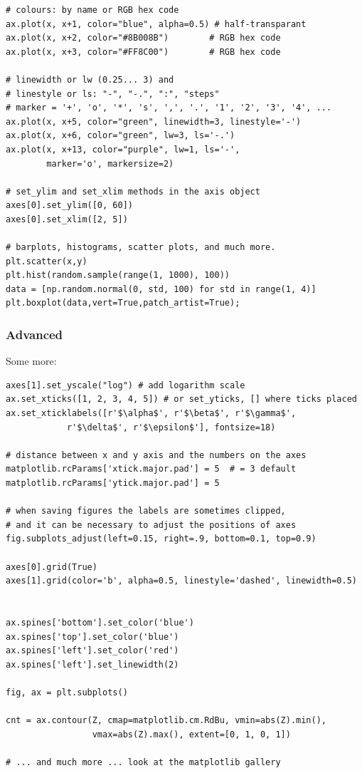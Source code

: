 \documentclass[11pt]{article}
\begin{document}
\begin{lstlisting}
# colours: by name or RGB hex code
ax.plot(x, x+1, color="blue", alpha=0.5) # half-transparant
ax.plot(x, x+2, color="#8B008B")        # RGB hex code
ax.plot(x, x+3, color="#FF8C00")        # RGB hex code 

# linewidth or lw (0.25... 3) and 
# linestyle or ls: "-", "-.", ":", "steps"
# marker = '+', 'o', '*', 's', ',', '.', '1', '2', '3', '4', ...
ax.plot(x, x+5, color="green", linewidth=3, linestyle='-')
ax.plot(x, x+6, color="green", lw=3, ls='-.')
ax.plot(x, x+13, color="purple", lw=1, ls='-', 
        marker='o', markersize=2)

# set_ylim and set_xlim methods in the axis object
axes[0].set_ylim([0, 60])
axes[0].set_xlim([2, 5])

# barplots, histograms, scatter plots, and much more.
plt.scatter(x,y)
plt.hist(random.sample(range(1, 1000), 100))
data = [np.random.normal(0, std, 100) for std in range(1, 4)]
plt.boxplot(data,vert=True,patch_artist=True); 
\end{lstlisting}

\subsubsection{Advanced}
Some more:
\begin{lstlisting}
axes[1].set_yscale("log") # add logarithm scale
ax.set_xticks([1, 2, 3, 4, 5]) # or set_yticks, [] where ticks placed
ax.set_xticklabels([r'$\alpha$', r'$\beta$', r'$\gamma$', 
            r'$\delta$', r'$\epsilon$'], fontsize=18)

# distance between x and y axis and the numbers on the axes
matplotlib.rcParams['xtick.major.pad'] = 5  # = 3 default
matplotlib.rcParams['ytick.major.pad'] = 5

# when saving figures the labels are sometimes clipped, 
# and it can be necessary to adjust the positions of axes
fig.subplots_adjust(left=0.15, right=.9, bottom=0.1, top=0.9)

axes[0].grid(True)
axes[1].grid(color='b', alpha=0.5, linestyle='dashed', linewidth=0.5)


ax.spines['bottom'].set_color('blue')
ax.spines['top'].set_color('blue')
ax.spines['left'].set_color('red')
ax.spines['left'].set_linewidth(2)

fig, ax = plt.subplots()

cnt = ax.contour(Z, cmap=matplotlib.cm.RdBu, vmin=abs(Z).min(), 
				 vmax=abs(Z).max(), extent=[0, 1, 0, 1])

# ... and much more ... look at the matplotlib gallery
\end{lstlisting}
\end{document}
